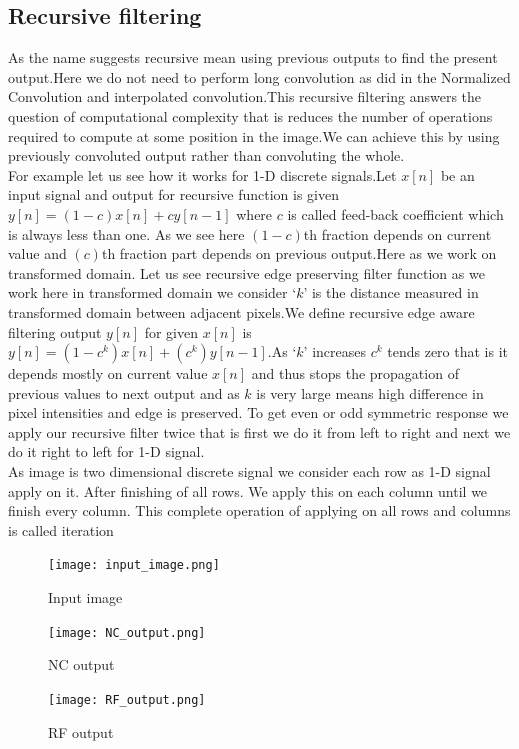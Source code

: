 \documentclass[conference]{IEEEtran}
\begin{document}
  \subsection{Recursive filtering}
  	As the name suggests recursive mean using previous outputs to find the present output.Here we do not need to perform long convolution as did in the Normalized Convolution and interpolated convolution.This recursive filtering answers the question of computational complexity that is reduces the number of operations required to compute at some position in the image.We can achieve this by using previously convoluted output rather than convoluting the whole.\\
  	 For example let us see how it works for 1-D discrete signals.Let $x[n]$ be an input signal and output for recursive function is given $y[n] = (1-c)x[n] + cy[n-1]$ where $c$ is called feed-back coefficient which is always less than one. As we see here $(1-c)$th fraction depends on current value and $(c)$th fraction part depends on previous output.Here as we work on transformed domain. 
Let us see recursive edge preserving filter function as we work here in transformed domain we consider ‘$k$’ is the distance measured in transformed domain between adjacent pixels.We define recursive edge aware filtering output $y[n]$ for given $x[n]$ is $y[n] = (1-c^k)x[n]+(c^k)y[n-1]$.As ‘$k$’ increases $c^k$ tends zero that is it depends mostly on current value $x[n]$ and thus stops the propagation of previous values to next output and  as $k$ is very large means high difference in pixel intensities and edge is preserved. To get even or odd symmetric response we apply our recursive filter twice that is first we do it from left to right and next we do it right to left for 1-D signal. \\
	As image is two dimensional discrete signal we consider each row as 1-D signal apply on it. After finishing of all rows. We apply this on each column until we finish every column. This complete operation of applying on all rows and columns is called iteration


\begin{figure}
 	\texttt{[image: input\_image.png]}
 	\caption{Input image}
 \end{figure}
 
 \begin{figure}
 	\texttt{[image: NC\_output.png]}
 	\caption{NC output}
 \end{figure}
 
 \begin{figure}
 	\texttt{[image: RF\_output.png]}
 	\caption{RF output}
 \end{figure}
 
\end{document}

